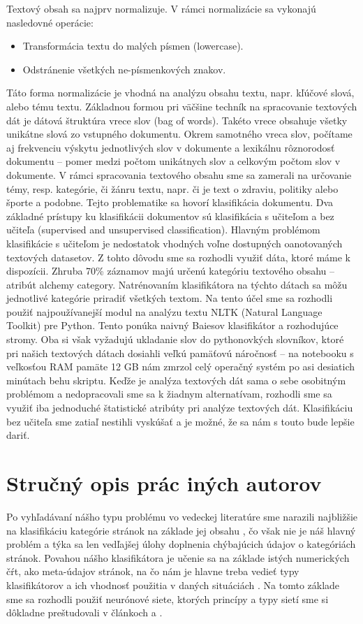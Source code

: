 \documentclass{iitsrc}
\begin{document}
\begin{multicols}{2}
%
Textový obsah sa najprv normalizuje. V rámci normalizácie sa vykonajú nasledovné operácie:
%
\begin{itemize}
	\item Transformácia textu do malých písmen (lowercase).
	\item Odstránenie všetkých ne-písmenkových znakov.
\end{itemize}
%
Táto forma normalizácie je vhodná na analýzu obsahu textu, napr. kľúčové slová, alebo tému textu.
%
Základnou formou pri väčšine techník na spracovanie textových dát je dátová štruktúra vrece slov (bag of words). Takéto vrece obsahuje všetky unikátne slová zo vstupného dokumentu. Okrem samotného vreca slov, počítame aj frekvenciu výskytu jednotlivých slov v dokumente a lexikálnu rôznorodosť dokumentu – pomer medzi počtom unikátnych slov a celkovým počtom slov v dokumente.
%
V rámci spracovania textového obsahu sme sa zamerali na určovanie témy, resp. kategórie, či žánru textu, napr. či je text o zdraviu, politiky alebo športe a podobne. Tejto problematike sa hovorí klasifikácia dokumentu. Dva základné prístupy ku klasifikácii dokumentov sú klasifikácia s učiteľom a bez učiteľa (supervised and unsupervised classification).
%
Hlavným problémom klasifikácie s učiteľom je nedostatok vhodných voľne dostupných oanotovaných textových datasetov. Z tohto dôvodu sme sa rozhodli využiť dáta, ktoré máme k dispozícii. Zhruba 70\% záznamov majú určenú kategóriu textového obsahu – atribút alchemy category. Natrénovaním klasifikátora na týchto dátach sa môžu jednotlivé kategórie priradiť všetkých textom. Na tento účel sme sa rozhodli použiť najpoužívanejší modul na analýzu textu NLTK (Natural Language Toolkit) pre Python. Tento ponúka naivný Baiesov klasifikátor a rozhodujúce stromy. Oba si však vyžadujú ukladanie slov do pythonovkých slovníkov, ktoré pri našich textových dátach dosiahli veľkú pamäťovú náročnosť – na notebooku s veľkosťou RAM pamäte 12 GB nám zmrzol celý operačný systém po asi desiatich minútach behu skriptu.
%
Keďže je analýza textových dát sama o sebe osobitným problémom a nedopracovali sme sa k žiadnym alternatívam, rozhodli sme sa využiť iba jednoduché štatistické atribúty pri analýze textových dát.
%
Klasifikáciu bez učiteľa sme zatiaľ nestihli vyskúšať a je možné, že sa nám s touto bude lepšie dariť.

\section{Stručný opis prác iných autorov}
%
Po vyhľadávaní nášho typu problému vo vedeckej literatúre sme narazili najbližšie na klasifikáciu kategórie stránok na základe jej obsahu \cite{kosala2000web}, čo však nie je náš hlavný problém a týka sa len vedľajšej úlohy doplnenia chýbajúcich údajov o kategóriách stránok. Povahou nášho klasifikátora je učenie sa na základe istých numerických čŕt, ako meta-údajov stránok, na čo nám je hlavne treba vedieť typy klasifikátorov a ich vhodnosť použitia v daných situáciách \cite{qi2009web}.  Na tomto základe sme sa rozhodli použiť neurónové siete, ktorých princípy a typy sietí sme si dôkladne preštudovali v článkoch \cite{de1997brief} a \cite{lek1999artificial}.


\end{multicols}
\end{document}
